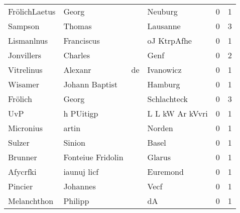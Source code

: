 \begin{tabular}{llllrr}
            FrölichLaetus &                              Georg &             &                                     Neuburg &          0 &         1 \\
                  Sampson &                             Thomas &             &                                    Lausanne &          0 &         3 \\
               Lismanlnus &                         Franciscus &             &                                 oJ KtrpAfhe &          0 &         1 \\
               Jonvillers &                            Charles &             &                                        Genf &          0 &         2 \\
               Vitrelinus &                            Alexanr &          de &                                   Ivanowicz &          0 &         1 \\
                  Wisamer &                     Johann Baptist &             &                                     Hamburg &          0 &         1 \\
                  Frölich &                              Georg &             &                                 Schlachteck &          0 &         3 \\
                      UvP &                          h PUitigp &             &                             L L kW Ar kVvri &          0 &         1 \\
                Micronius &                              artin &             &                                      Norden &          0 &         1 \\
                   Sulzer &                             Sinion &             &                                       Basel &          0 &         1 \\
                  Brunner &                  Fonteiue Fridolin &             &                                      Glarus &          0 &         1 \\
                 Afycrfki &                        iaunuj licf &             &                                    Euremond &          0 &         1 \\
                  Pincier &                           Johannes &             &                                        Vecf &          0 &         1 \\
              Melanchthon &                            Philipp &             &                                          dA &          0 &         1 \\

\end{tabular}
